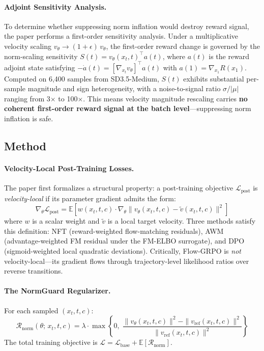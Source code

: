 \documentclass[11pt,a4paper]{article}
\begin{document}
\paragraph{Adjoint Sensitivity Analysis.} To determine whether suppressing norm inflation would destroy reward signal, the paper performs a first-order sensitivity analysis. Under a multiplicative velocity scaling $v_\theta \to (1+\epsilon)\,v_\theta$, the first-order reward change is governed by the norm-scaling sensitivity $S(t) = v_\theta(x_t,t)^\top a(t)$, where $a(t)$ is the reward adjoint state satisfying $-\dot{a}(t) = [\nabla_{x_t} v_\theta]^\top a(t)$ with $a(1) = \nabla_{x_1} R(x_1)$. Computed on 6,400 samples from SD3.5-Medium, $S(t)$ exhibits substantial per-sample magnitude and sign heterogeneity, with a noise-to-signal ratio $\sigma/|\mu|$ ranging from 3$\times$ to 100$\times$. This means velocity magnitude rescaling carries \textbf{no coherent first-order reward signal at the batch level}---suppressing norm inflation is safe.

\subsection{Method}

\paragraph{Velocity-Local Post-Training Losses.} The paper first formalizes a structural property: a post-training objective $\mathcal{L}_{\mathrm{post}}$ is \emph{velocity-local} if its parameter gradient admits the form:
\begin{equation}
\nabla_\theta \mathcal{L}_{\mathrm{post}} = \mathbb{E}\!\left[w(x_t,t,c) \cdot \nabla_\theta \|v_\theta(x_t,t,c) - \tilde{v}(x_t,t,c)\|^2\right]
\end{equation}
where $w$ is a scalar weight and $\tilde{v}$ is a local target velocity. Three methods satisfy this definition: NFT (reward-weighted flow-matching residuals), AWM (advantage-weighted FM residual under the FM-ELBO surrogate), and DPO (sigmoid-weighted local quadratic deviations). Critically, Flow-GRPO is \emph{not} velocity-local---its gradient flows through trajectory-level likelihood ratios over reverse transitions.

\paragraph{The NormGuard Regularizer.} For each sampled $(x_t, t, c)$:
\begin{equation}
\mathcal{R}_{\mathrm{norm}}(\theta;\, x_t,t,c) = \lambda \cdot \max\!\left\{0,\;\frac{\|v_\theta(x_t,t,c)\|^2 - \|v_{\mathrm{ref}}(x_t,t,c)\|^2}{\|v_{\mathrm{ref}}(x_t,t,c)\|^2}\right\}
\end{equation}
The total training objective is $\mathcal{L} = \mathcal{L}_{\mathrm{base}} + \mathbb{E}[\mathcal{R}_{\mathrm{norm}}]$.
\end{document}
